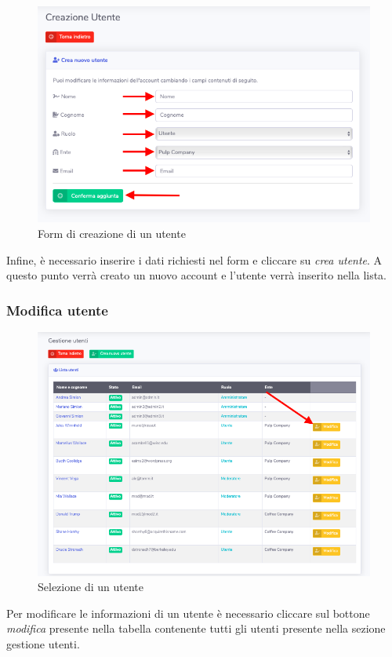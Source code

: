 		\begin{figure}[H]
		\centering
		\includegraphics[scale=0.600]{res/images/admin/creazUtente.png}
		\caption{Form di creazione di un utente}
	\end{figure}
	Infine, è necessario inserire i dati richiesti nel form e cliccare su \textit{crea utente}. 
	A questo punto verrà creato un nuovo account e l'utente verrà inserito nella lista.

	\subsubsection{Modifica utente}

		\begin{figure}[H]
		\centering
		\includegraphics[scale=0.600]{res/images/admin/selModUtente.png}
		\caption{Selezione di un utente}
	\end{figure}
	Per modificare le informazioni di un utente è necessario cliccare sul bottone \textit{modifica} presente nella tabella contenente tutti gli utenti presente nella sezione gestione utenti.

